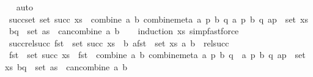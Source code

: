 \begin{isabellebody}
\ %
\endisadelimproof
%
\isatagproof
{}\isamarkupfalse%
\ auto%
\endisatagproof
{\isafoldproof}%
%
\isadelimproof
%
\endisadelimproof
\isanewline
\isanewline
{}\isamarkupfalse%
\ succ{\isacharunderscore}{\kern0pt}set{\isacharcolon}{\kern0pt}\ {\isachardoublequoteopen}set\ {\isacharparenleft}{\kern0pt}succ\ xs{\isacharparenright}{\kern0pt}\ {\isacharequal}{\kern0pt}\ {\isacharbraceleft}{\kern0pt}{\isacharparenleft}{\kern0pt}combine\ a\ b{\isacharcomma}{\kern0pt}\ combine{\isacharunderscore}{\kern0pt}meta\ a\ p\ b\ q{\isacharparenright}{\kern0pt}\ {\isacharbar}{\kern0pt}a\ p\ b\ q{\isachardot}{\kern0pt}\ {\isacharparenleft}{\kern0pt}a{\isacharcomma}{\kern0pt}p{\isacharparenright}{\kern0pt}\ {\isasymin}\ set\ xs\ {\isasymand}\ {\isacharparenleft}{\kern0pt}b{\isacharcomma}{\kern0pt}q{\isacharparenright}{\kern0pt}\ {\isasymin}\ set\ as\ {\isasymand}\ can{\isacharunderscore}{\kern0pt}combine\ a\ b{\isacharbraceright}{\kern0pt}{\isachardoublequoteclose}\isanewline
%
\isadelimproof
\ \ %
\endisadelimproof
%
\isatagproof
{}\isamarkupfalse%
\ {\isacharparenleft}{\kern0pt}induction\ xs{\isacharparenright}{\kern0pt}\ {\isacharparenleft}{\kern0pt}simp{\isacharcomma}{\kern0pt}fastforce{\isacharparenright}{\kern0pt}%
\endisatagproof
{\isafoldproof}%
%
\isadelimproof
\isanewline
%
\endisadelimproof
\isanewline
{}\isamarkupfalse%
\ succ{\isacharunderscore}{\kern0pt}rel{\isacharunderscore}{\kern0pt}succ{\isacharcolon}{\kern0pt}\ {\isachardoublequoteopen}fst\ {\isacharbackquote}{\kern0pt}\ set\ {\isacharparenleft}{\kern0pt}succ\ xs{\isacharparenright}{\kern0pt}\ {\isacharequal}{\kern0pt}\ {\isacharbraceleft}{\kern0pt}b{\isachardot}{\kern0pt}\ {\isasymexists}a{\isasymin}fst\ {\isacharbackquote}{\kern0pt}\ set\ xs{\isachardot}{\kern0pt}\ {\isacharparenleft}{\kern0pt}a{\isacharcomma}{\kern0pt}\ b{\isacharparenright}{\kern0pt}\ {\isasymin}\ rel{\isacharunderscore}{\kern0pt}succ{\isacharbraceright}{\kern0pt}{\isachardoublequoteclose}\isanewline
%
\isadelimproof
%
\endisadelimproof
%
\isatagproof
{}\isamarkupfalse%
\ {\isacharminus}{\kern0pt}\isanewline
\ \ \isamarkupfalse%
\ {\isachardoublequoteopen}fst\ {\isacharbackquote}{\kern0pt}\ set\ {\isacharparenleft}{\kern0pt}succ\ xs{\isacharparenright}{\kern0pt}\ {\isacharequal}{\kern0pt}\ fst\ {\isacharbackquote}{\kern0pt}\ {\isacharbraceleft}{\kern0pt}{\isacharparenleft}{\kern0pt}combine\ a\ b{\isacharcomma}{\kern0pt}\ combine{\isacharunderscore}{\kern0pt}meta\ a\ p\ b\ q{\isacharparenright}{\kern0pt}\ {\isacharbar}{\kern0pt}\ a\ p\ b\ q{\isachardot}{\kern0pt}\ {\isacharparenleft}{\kern0pt}a{\isacharcomma}{\kern0pt}p{\isacharparenright}{\kern0pt}\ {\isasymin}\ set\ xs\ {\isasymand}{\isacharparenleft}{\kern0pt}b{\isacharcomma}{\kern0pt}q{\isacharparenright}{\kern0pt}\ {\isasymin}\ set\ as\ {\isasymand}\ can{\isacharunderscore}{\kern0pt}combine\ a\ b{\isacharbraceright}{\kern0pt}{\isachardoublequoteclose}\ \isamarkupfalse%

\end{isabellebody}
